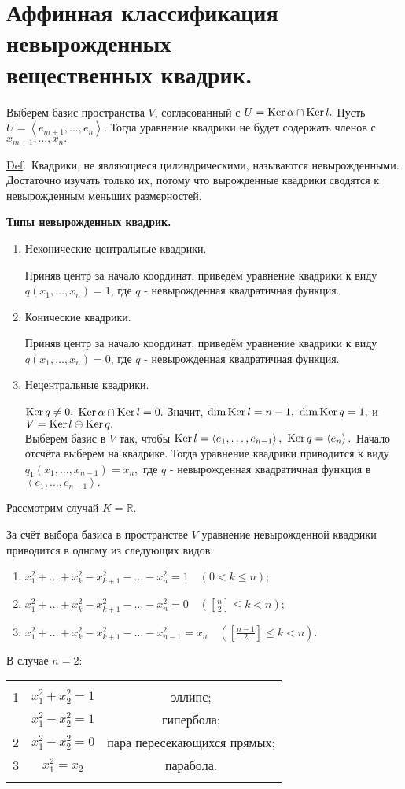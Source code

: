 \documentclass[a4paper]{article}%
\renewcommand{\de}{\par\noindent\underline{Def}.\ }%
\renewcommand{\ab}{\par\noindent}%
\newcommand{\lob}[1]{\left\langle#1\right\rangle}%
\newcommand{\ps}{\oplus}
\newcommand{\rom}[1]{{\rm#1\,}}
\renewcommand{\le}{\leqslant}
\begin{document}
\section{Аффинная классификация невырожденных\\ вещественных квадрик.}
\label{q45}
Выберем базис пространства $V$, согласованный с $U=\rom{Ker}\alpha\cap\rom{Ker}l.$ Пусть $U=\lob{e_{m+1},\dots,e_n}.$ Тогда
уравнение квадрики не будет содержать членов с\ \ $x_{m+1},\dots,x_n.$
\de Квадрики, не являющиеся цилиндрическими, называются невырожденными. Достаточно изучать только их, потому что
вырожденные квадрики сводятся к невырожденным меньших размерностей.
\ab
\centerline{\bf Типы невырожденных квадрик.}
\begin{enumerate}
    \item Неконические центральные квадрики.\ab Приняв центр за начало координат, приведём уравнение квадрики к виду
    $
    q(x_1,\dots,x_n)=1
    $, где $q$ - невырожденная квадратичная функция.
    \item Конические квадрики.\ab Приняв центр за начало координат, приведём уравнение квадрики к виду
    $
    q(x_1,\dots,x_n)=0
    $, где $q$ - невырожденная квадратичная функция.
    \item Нецентральные квадрики.\ab
    $\rom{Ker}q\ne 0,$ $\rom{Ker}\alpha\cap\rom{Ker}l=0.$ Значит, $\dim\rom{Ker}l=n-1,\ \dim\rom{Ker}q=1,$ и $V=\rom{Ker}l\ps\rom{Ker}q.$\\
    Выберем базис в $V$ так, чтобы $\rom{Ker}l=\lob{e_1,\dots,e_{n-1}},\ \rom{Ker}q=\lob{e_n}.$ Начало отсчёта выберем
    на квадрике. Тогда уравнение квадрики приводится к виду $q_1(x_1,\dots,x_{n-1})=x_n,$ где $q$ - невырожденная квадратичная
    функция в $\lob{e_1,\dots,e_{n-1}}.$
\end{enumerate}
Рассмотрим случай $K=\mathbb{R}.$
\ab За счёт выбора базиса в пространстве $V$ уравнение невырожденной квадрики приводится в одному из следующих видов:
\begin{enumerate}
    \item $x_1^2+\dots+x_k^2-x_{k+1}^2-\dots-x_n^2=1\quad(0<k\le n);$
    \item $x_1^2+\dots+x_k^2-x_{k+1}^2-\dots-x_n^2=0\quad\left(\left[\frac{\displaystyle n}{\displaystyle 2}\right]\le k<n\right);$
    \item $x_1^2+\dots+x_k^2-x_{k+1}^2-\dots-x_{n-1}^2=x_n\quad\left(\left[\frac{\displaystyle n-1}{\displaystyle 2}\right]\le k<n\right).$
\end{enumerate}
В случае $n=2$:\ab
\begin{tabular}{ccc}
  & & \\
  1 & $x_1^2+x_2^2=1$ & эллипс; \\

    & $x_1^2-x_2^2=1$ & гипербола; \\
  2 & $x_1^2-x_2^2=0$ & пара пересекающихся прямых; \\
  3 & $x_1^2=x_2$ & парабола. \\
   & & \\
\end{tabular}
\end{document}
